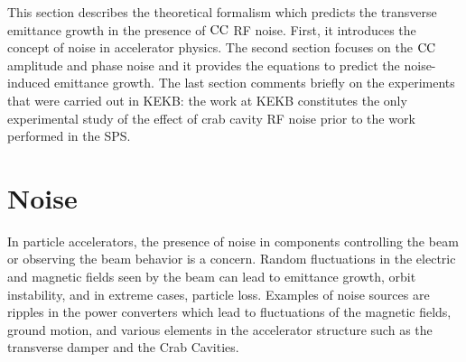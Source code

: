 This section describes the theoretical formalism which predicts the transverse emittance growth in the presence of ${\mathrm{CC}}$ RF noise. First, it introduces the concept of noise in accelerator physics. The second section focuses on the ${\mathrm{CC}}$ amplitude and phase noise and it provides the equations to predict the noise-induced emittance growth. The last section comments briefly on the experiments that were carried out in KEKB: the work at KEKB constitutes the only experimental study of the effect of crab cavity RF noise prior to the work performed in the SPS. 



\section{Noise}\label{sec:noise_definition}
In particle accelerators, the presence of noise in components controlling the beam or observing the beam behavior is a concern. Random fluctuations in the electric and magnetic fields seen by the beam can lead to emittance growth, orbit instability, and in extreme cases, particle loss. Examples of noise sources are ripples in the power converters which lead to fluctuations of the magnetic fields, ground motion, and various elements in the accelerator structure such as the transverse damper and the Crab Cavities. %

